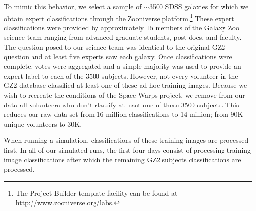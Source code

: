 \documentclass[twocolumn]{aastex6}
\begin{document}
To mimic this behavior, we select a sample of $\sim$3500 SDSS galaxies for which we obtain expert classifications through the Zooniverse platform.\footnote{The Project Builder template facility can be found at \url{http://www.zooniverse.org/labs.}}
These expert classifications were provided by approximately 15 members of the
Galaxy Zoo science team ranging from advanced graduate students, post docs, and 
faculty. The question posed to our science team was identical to the original GZ2
question and at least five experts saw each galaxy. Once classifications were complete,
votes were aggregated and a simple majority was used to provide an expert label to
each of the 3500 subjects. However, not  every volunteer in the GZ2 database 
classified at least one of these ad-hoc training images. Because we wish to recreate 
the conditions of the Space Warps project, we remove from our data all volunteers 
who don't classify at least one of these 3500 subjects. This reduces our raw data set from
16 million classifications to 14 million; from 90K unique volunteers to 30K. 

When running a simulation, classifications of these training images are processed first. 
In all of our simulated runs, the first four days consist of processing training 
image classifications after which the remaining GZ2 subjects classifications are processed.
\end{document}

